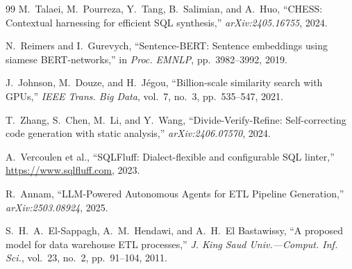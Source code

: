 \documentclass[9pt,a4paper,twocolumn,twoside]{rho-class/rho}
\begin{document}
\begin{thebibliography}{99}
M.~Talaei, M.~Pourreza, Y.~Tang, B.~Salimian, and A.~Huo,
``CHESS: Contextual harnessing for efficient SQL synthesis,''
\textit{arXiv:2405.16755}, 2024.

N.~Reimers and I.~Gurevych,
``Sentence-BERT: Sentence embeddings using siamese BERT-networks,''
in \textit{Proc. EMNLP}, pp.~3982--3992, 2019.

J.~Johnson, M.~Douze, and H.~Jégou,
``Billion-scale similarity search with GPUs,''
\textit{IEEE Trans. Big Data}, vol.~7, no.~3, pp.~535--547, 2021.

T.~Zhang, S.~Chen, M.~Li, and Y.~Wang,
``Divide-Verify-Refine: Self-correcting code generation with static analysis,''
\textit{arXiv:2406.07570}, 2024.

A.~Vercoulen et al.,
``SQLFluff: Dialect-flexible and configurable SQL linter,''
\url{https://www.sqlfluff.com}, 2023.

R.~Annam,
``LLM-Powered Autonomous Agents for ETL Pipeline Generation,''
\textit{arXiv:2503.08924}, 2025.

S.~H.~A.~El-Sappagh, A.~M.~Hendawi, and A.~H.~El Bastawissy,
``A proposed model for data warehouse ETL processes,''
\textit{J. King Saud Univ.---Comput. Inf. Sci.}, vol.~23, no.~2, pp.~91--104, 2011.

\end{thebibliography}

\end{document}
